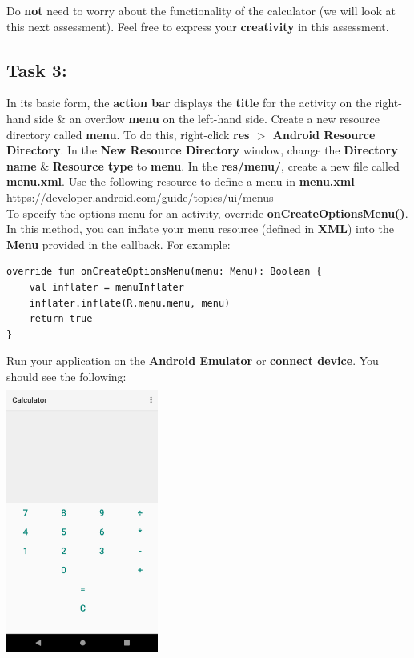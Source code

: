 \documentclass{article}
\begin{document}
Do \textbf{not} need to worry about the functionality of the calculator (we will look at this next assessment). Feel free to express your \textbf{creativity} in this assessment.

\subsection*{Task 3:} In its basic form, the \textbf{action bar} displays the \textbf{title} for the activity on the right-hand side \& an overflow \textbf{menu} on the left-hand side. Create a new resource directory called \textbf{menu}. To do this, right-click \textbf{res $>$ Android Resource Directory}. In the \textbf{New Resource Directory} window, change the \textbf{Directory name} \& \textbf{Resource type} to \textbf{menu}. In the \textbf{res/menu/}, create a new file called \textbf{menu.xml}. Use the following resource to define a menu in \textbf{menu.xml} - \href{https://developer.android.com/guide/topics/ui/menus}{https://developer.android.com/guide/topics/ui/menus} \\ 

To specify the options menu for an activity, override \textbf{onCreateOptionsMenu()}. In this method, you can inflate your menu resource (defined in \textbf{XML}) into the \textbf{Menu} provided in the callback. For example:

\begin{verbatim}
override fun onCreateOptionsMenu(menu: Menu): Boolean {
    val inflater = menuInflater
    inflater.inflate(R.menu.menu, menu)
    return true
}
\end{verbatim}

Run your application on the \textbf{Android Emulator} or \textbf{connect device}. You should see the following: \\

\includegraphics[width=5cm, height=9cm]{../tex/img/02-android-overview/practical/calculator-with-menu.png} 
\end{document}
